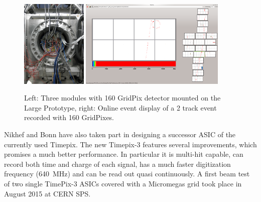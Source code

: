 \begin{figure}[!t]
  \centering
  \includegraphics[width=0.28\textwidth]{Tracker/TPC_Bonn/plots/TPC_pixels_LP_GridPixes.png}
  \includegraphics[width=0.62\textwidth]{Tracker/TPC_Bonn/plots/TPC_pixels_event.png}
  \caption{Left: Three modules with 160 GridPix detector mounted on the Large
    Prototype, right: Online event display of a 2 track event recorded with
    160 GridPixes.}
  \label{fig_TPC_pixels_2}
\end{figure}

Nikhef and Bonn have also taken part in designing a successor ASIC of
the currently used Timepix. The new Timepix-3 features several improvements,
which promises a much better performance. In particular it is multi-hit capable,
can record both time and charge of each signal, has a much faster
digitization frequency (\SI{640}{MHz}) and can be read out  quasi continuously.
A first beam test of two single TimePix-3 ASICs covered with a Micromegas
grid took place in August 2015 at CERN SPS.


